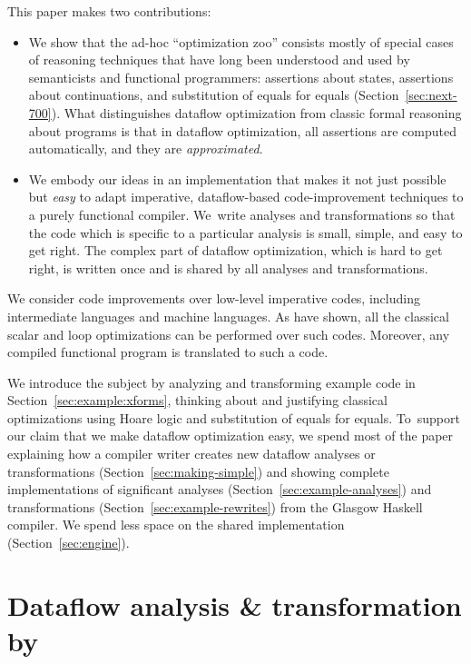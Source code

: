 \documentclass[blockstyle,preprint,nocopyrightspace]{sigplanconf}
\newcommand\secref[1]{Section~\ref{sec:#1}}
\begin{document}
This paper makes two contributions:
\begin{itemize}
\item
We show that the ad-hoc ``optimization zoo'' consists mostly of special
cases of reasoning techniques that have long been understood and used
by semanticists and functional programmers:
assertions about states, assertions about continuations, and
substitution of equals for equals (\secref{next-700}).
What distinguishes dataflow optimization from classic formal reasoning
about programs is that in dataflow optimization, all assertions are
computed automatically, and they are
\emph{approximated}. 
\item
We embody our ideas in an implementation that makes it not just
possible but \emph{easy} to adapt imperative, dataflow-based
code-improvement techniques to a purely functional compiler.
We~write analyses and transformations so that
the code which is specific to a particular analysis is small, simple,
and easy to get right.
The complex part of dataflow optimization, which is hard to get right, is
written once and is shared by all analyses and transformations.
\end{itemize}

We consider code improvements over low-level
imperative codes, including intermediate languages and machine
languages.
As \citet{benitez-davidson:portable-optimizer} have shown, all the
classical scalar and loop optimizations can be performed over such
codes.
Moreover, any compiled functional program is
translated to such a code.


We introduce the subject by analyzing and transforming example code in
\secref{example:xforms},
thinking about and justifying classical optimizations using
Hoare logic and substitution of equals for equals.
To~support our claim that we make dataflow optimization easy, 
we spend most of the paper explaining how
a compiler writer creates new dataflow analyses or transformations
(\secref{making-simple}) and showing complete implementations of significant
analyses (\secref{example-analyses}) and transformations
(\secref{example-rewrites}) from the Glasgow Haskell compiler.
We spend less space on the shared implementation (\secref{engine}).


\section{Dataflow analysis {\&} transformation by }
\end{document}
